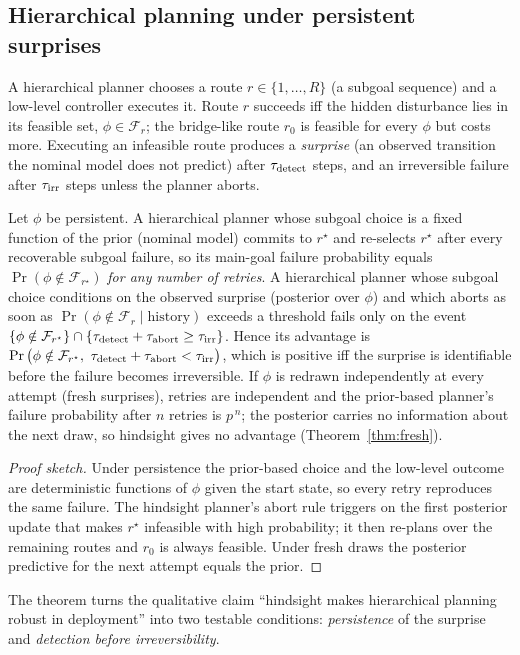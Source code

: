 \subsection{Hierarchical planning under persistent surprises}
\label{sec:theory-hier}
A hierarchical planner chooses a route $r\in\{1,\dots,R\}$ (a subgoal sequence) and a low-level controller executes it.
Route $r$ succeeds iff the hidden disturbance lies in its feasible set, $\phi\in\mathcal F_r$; the bridge-like route
$r_0$ is feasible for every $\phi$ but costs more. Executing an infeasible route produces a \emph{surprise} (an observed
transition the nominal model does not predict) after $\tau_{\rm detect}$ steps, and an irreversible failure after
$\tau_{\rm irr}$ steps unless the planner aborts.

\begin{theorem}\label{thm:hier}
Let $\phi$ be persistent. A hierarchical planner whose subgoal choice is a fixed function of the prior (nominal model)
commits to $r^\star$ and re-selects $r^\star$ after every recoverable subgoal failure, so its main-goal failure
probability equals $\Pr(\phi\notin\mathcal F_{r^\star})$ \emph{for any number of retries}. A hierarchical planner whose
subgoal choice conditions on the observed surprise (posterior over $\phi$) and which aborts as soon as
$\Pr(\phi\notin\mathcal F_{r}\mid\text{history})$ exceeds a threshold fails only on the event
$\{\phi\notin\mathcal F_{r^\star}\}\cap\{\tau_{\rm detect}+\tau_{\rm abort}\ge\tau_{\rm irr}\}$.
Hence its advantage is $\Pr\big(\phi\notin\mathcal F_{r^\star},\ \tau_{\rm detect}+\tau_{\rm abort}<\tau_{\rm irr}\big)$,
which is positive iff the surprise is identifiable before the failure becomes irreversible.
If $\phi$ is redrawn independently at every attempt (fresh surprises), retries are independent and the
prior-based planner's failure probability after $n$ retries is $p^{\,n}$; the posterior carries no information about the
next draw, so hindsight gives no advantage (Theorem~\ref{thm:fresh}).
\end{theorem}
\begin{proof}[Proof sketch]
Under persistence the prior-based choice and the low-level outcome are deterministic functions of $\phi$ given the
start state, so every retry reproduces the same failure. The hindsight planner's abort rule triggers on the first
posterior update that makes $r^\star$ infeasible with high probability; it then re-plans over the remaining routes
and $r_0$ is always feasible. Under fresh draws the posterior predictive for the next attempt equals the prior.
\end{proof}
The theorem turns the qualitative claim ``hindsight makes hierarchical planning robust in deployment'' into two
testable conditions: \emph{persistence} of the surprise and \emph{detection before irreversibility}.
